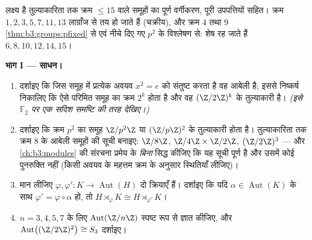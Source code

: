 \begin{problem}\label{pb:b3:groups:1}
लक्ष्य है तुल्याकारिता तक क्रम $\leq 15$ वाले समूहों का पूर्ण
वर्गीकरण, पूरी उपपत्तियों सहित। क्रम $1, 2, 3, 5,
7, 11, 13$ लाग्राँज से तय हो
जाते हैं (चक्रीय), और क्रम $4$ तथा $9$ \cref{thm:b3:groups:pfixed} से एवं नीचे
दिए गए $p^2$ के विश्लेषण से: शेष रह जाते हैं $6, 8, 10, 12, 14, 15$।

\medskip
\noindent\textbf{भाग I --- साधन।}
\begin{enumerate}
  \item दर्शाइए कि जिस समूह में प्रत्येक अवयव $x^2 =
        e$ को संतुष्ट
        करता है वह आबेली है; इससे निष्कर्ष निकालिए कि ऐसे परिमित
        समूह का क्रम $2^k$ होता है और वह $(\Z/2\Z)^k$ के तुल्याकारी है।
        \emph{(इसे $\mathbb F_2$ पर एक सदिश समष्टि की तरह देखिए।)}
  \item दर्शाइए कि क्रम $p^2$ का समूह $\Z/p^2\Z$ या $(\Z/p\Z)^2$ के
        तुल्याकारी होता है। तुल्याकारिता तक क्रम $8$ के आबेली
        समूहों की सूची बनाइए: $\Z/8\Z$, $\Z/4\Z \times
        \Z/2\Z$, $(\Z/2\Z)^3$ --- और \cref{ch:b3:modules}
        की संरचना प्रमेय के \emph{बिना} सिद्ध कीजिए कि यह सूची
        पूर्ण है और उसमें कोई पुनरुक्ति नहीं (किसी अवयव के महत्तम
        क्रम के अनुसार स्थितियाँ लीजिए)।
  \item मान लीजिए $\varphi, \varphi' \colon K \to \operatorname{Aut}(H)$ दो क्रियाएँ हैं। दर्शाइए कि यदि $\alpha \in \operatorname{Aut}(K)$
        के साथ $\varphi' = \varphi \circ
        \alpha$ हो, तो $H
        \rtimes_{\varphi} K \cong H \rtimes_{\varphi'} K$।
  \item $n = 3, 4, 5,
        7$ के लिए $\operatorname{Aut}(\Z/n\Z)$ स्पष्ट रूप से ज्ञात कीजिए, और $\operatorname{Aut}\bigl((\Z/2\Z)^2
        \bigr) \cong S_3$
        दर्शाइए।
\end{enumerate}


\end{problem}
